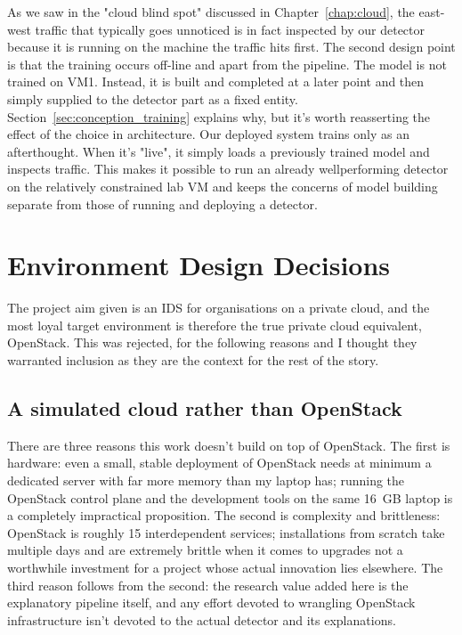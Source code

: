 As we saw in the "cloud blind spot" discussed in Chapter~\ref{chap:cloud}, the east-west traffic that typically goes unnoticed is in fact inspected by our detector because it is running on the machine the traffic hits first. The second design point is that the training occurs off-line and apart from the pipeline. The model is not trained on VM1. Instead, it is built and completed at a later point and then simply supplied to the detector part as a fixed entity. 
Section~\ref{sec:conception_training} explains why, but it's worth reasserting the effect of the choice in architecture. 
Our deployed system trains only as an afterthought. When it's "live", it simply loads a previously trained model and inspects traffic. This makes it possible to run an already wellperforming detector on the relatively constrained lab VM and keeps the concerns of model building separate from those of running and deploying a detector.
\section{Environment Design Decisions}
\label{sec:conception_environment}

The project aim given is an IDS for organisations on a private cloud, and the most loyal target environment is therefore the true private cloud equivalent, OpenStack. This was rejected, for the following reasons and I thought they warranted inclusion as they are the context for the rest of the story.

\subsection{A simulated cloud rather than OpenStack}
\label{sec:conception_nostack}

There are three reasons this work doesn't build on top of OpenStack. The first is hardware: even a small, stable deployment of OpenStack needs at minimum a dedicated server with far more memory than my laptop has; running the OpenStack control plane and the development tools on the same 16~GB laptop is a completely impractical proposition. The second is complexity and brittleness: OpenStack is roughly 15 interdependent services; installations from scratch take multiple days and are extremely brittle when it comes to upgrades not a worthwhile investment for a project whose actual innovation lies elsewhere.
The third reason follows from the second: the research value added here is the explanatory pipeline itself, and any effort devoted to wrangling OpenStack infrastructure isn't devoted to the actual detector and its explanations.

